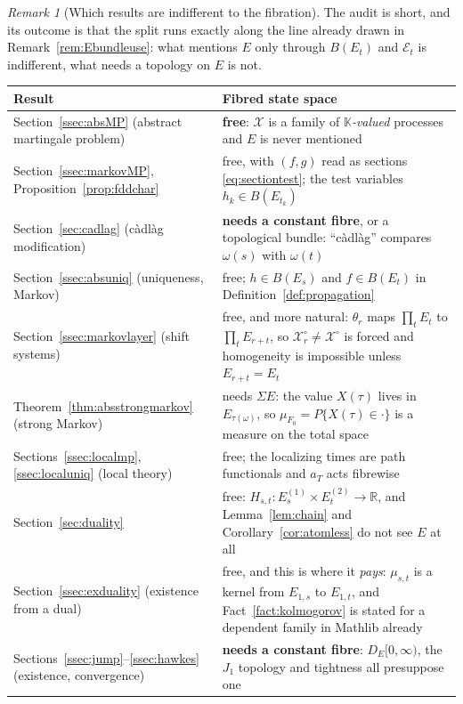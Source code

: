 \documentclass[11pt,a4paper]{article}
\theoremstyle{plain}
\theoremstyle{definition}
\theoremstyle{remark}
\newtheorem{remark}[theorem]{Remark}
\newcommand{\R}{\mathbb{R}}
\newcommand{\Bdd}{B}                           %
\newcommand{\DE}{D_E[0,\infty)}
\newcommand{\K}{\mathbb{K}}
\newcommand{\XX}{\mathcal{X}}                  %
\begin{document}
\begin{remark}[Which results are indifferent to the fibration]
  \label{rem:fibredaudit}
  The audit is short, and its outcome is that the split runs exactly along the
  line already drawn in Remark~\ref{rem:Ebundleuse}: what mentions $E$ only
  through $\Bdd(E_t)$ and $\mathcal{E}_t$ is indifferent, what needs a topology
  on $E$ is not.

  \medskip
  \noindent
  \begin{tabular}{@{}p{}p{}@{}}
  \toprule
  \textbf{Result} & \textbf{Fibred state space} \\
  \midrule
  Section~\ref{ssec:absMP} (abstract martingale problem)
    & \textbf{free}: $\XX$ is a family of \emph{$\K$-valued} processes and $E$ is
      never mentioned \\
  Section~\ref{ssec:markovMP}, Proposition~\ref{prop:fddchar}
    & free, with $(f,g)$ read as sections \eqref{eq:sectiontest}; the test
      variables $h_k \in \Bdd(E_{t_k})$ \\
  Section~\ref{sec:cadlag} (c\`adl\`ag modification)
    & \textbf{needs a constant fibre}, or a topological bundle: ``c\`adl\`ag''
      compares $\omega(s)$ with $\omega(t)$ \\
  Section~\ref{ssec:absuniq} (uniqueness, Markov)
    & free; $h \in \Bdd(E_s)$ and $f \in \Bdd(E_t)$ in
      Definition~\ref{def:propagation} \\
  Section~\ref{ssec:markovlayer} (shift systems)
    & free, and more natural: $\theta_r$ maps $\prod_t E_t$ to $\prod_t E_{r+t}$,
      so $\XX^\circ_r \neq \XX^\circ$ is forced and homogeneity is impossible
      unless $E_{r+t} = E_t$ \\
  Theorem~\ref{thm:absstrongmarkov} (strong Markov)
    & needs $\Sigma E$: the value $X(\tau)$ lives in $E_{\tau(\omega)}$, so
      $\mu_{F_0} = P\{X(\tau) \in \cdot\}$ is a measure on the total space \\
  Sections~\ref{ssec:localmp}, \ref{ssec:localuniq} (local theory)
    & free; the localizing times are path functionals and $a_T$ acts fibrewise \\
  Section~\ref{sec:duality}
    & free: $H_{s,t} : E^{(1)}_s \times E^{(2)}_t \to \R$, and
      Lemma~\ref{lem:chain} and Corollary~\ref{cor:atomless} do not see $E$ at all \\
  Section~\ref{ssec:exduality} (existence from a dual)
    & free, and this is where it \emph{pays}: $\mu_{s,t}$ is a kernel from
      $E_{1,s}$ to $E_{1,t}$, and Fact~\ref{fact:kolmogorov} is stated for a
      dependent family in Mathlib already \\
  Sections~\ref{ssec:jump}--\ref{ssec:hawkes} (existence, convergence)
    & \textbf{needs a constant fibre}: $\DE$, the $J_1$ topology and tightness
      all presuppose one \\
  \bottomrule
  \end{tabular}
\end{remark}
\end{document}
